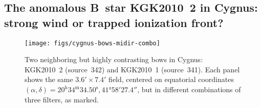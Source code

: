 \documentclass[useAMS, usenatbib, a4paper]{mnras}
\begin{document}
\subsection{The anomalous B~star KGK2010~2 in Cygnus: strong wind or
  trapped ionization front?}
\label{sec:anomalous-b-star}

\begin{figure}
  \centering
  \texttt{[image: figs/cygnus-bows-midir-combo]}
  \caption{Two neighboring but highly contrasting bows in Cygnus:
    KGK2010~2 (source~342) and KGK2010~1 (source~341). Each panel
    shows the same \(3.6' \times 7.4'\) field, centered on equatorial
    coordinates
    \((\alpha, \delta) = 20^{\text{h}}34^{\text{m}}34.50^{\text{s}},
    \ang{+41;58;27.4}\), but in different combinations of three
    filters, as marked. }
  \label{fig:cygnus-bows}
\end{figure}
\end{document}
